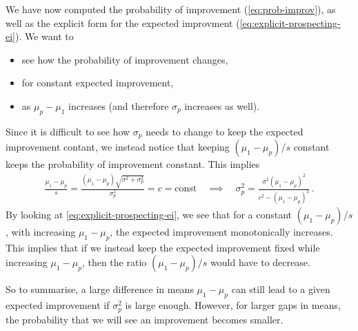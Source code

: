 \documentclass[a4paper]{article}
\theoremstyle{definition}
\begin{document}
We have now computed the probability of improvement (\cref{eq:prob-improv}), as well as the explicit form for the expected improvment (\cref{eq:explicit-prospecting-ei}). We want to
\begin{itemize}
\item see how the probability of improvement changes,
\item for constant expected improvement,
\item as $\mu_p - \mu_1$ increases (and therefore $\sigma_p$ increases as well).
\end{itemize}
Since it is difficult to see how $\sigma_p$ needs to change to keep the expected improvement contant, we instead notice that keeping $(\mu_1 - \mu_p)/s$ constant keeps the probability of improvement constant. This implies
\begin{align}
\frac{\mu_1 - \mu_p}{s} = \frac{(\mu_1 - \mu_p)\sqrt{\sigma^2 + \sigma_p^2}}{\sigma_p^2} = c = \text{const}
\quad \implies \quad
\sigma_p^2 = \frac{\sigma^2 (\mu_1 - \mu_p)^2}{c^2 - (\mu_1 - \mu_p)^2} \,.
\end{align}
By looking at \cref{eq:explicit-prospecting-ei}, we see that for a constant $(\mu_1 -\mu_p)/s$, with increasing $\mu_1 - \mu_p$, the expected improvement monotonically increases. This implies that if we instead keep the expected improvement fixed while increasing $\mu_1 - \mu_p$, then the ratio $(\mu_1 - \mu_p)/s$ would have to decrease.

So to summarise, a large difference in means $\mu_1 - \mu_p$ can still lead to a given expected improvement if $\sigma_p^2$ is large enough. However, for larger gaps in means, the probability that we will see an improvement becomes smaller.
\end{document}
